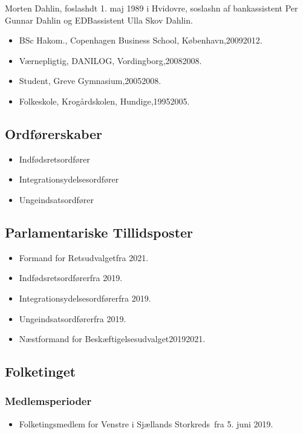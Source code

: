 \documentclass[11pt, a4paper]{awesome-cv}
\begin{document}
\makecvheader[R]
\makelettertitle
\begin{cvletter}
Morten Dahlin, foslashdt 1. maj 1989 i Hvidovre, soslashn af bankassistent Per Gunnar Dahlin og EDBassistent Ulla Skov Dahlin.

\begin{itemize}
\item BSc Hakom., Copenhagen Business School, København,20092012.
\item Værnepligtig, DANILOG, Vordingborg,20082008.
\item Student, Greve Gymnasium,20052008.
\item Folkeskole, Krogårdskolen, Hundige,19952005.
\end{itemize}
\subsection*{Ordførerskaber}
\begin{itemize}
\item Indfødsretsordfører
\item Integrationsydelsesordfører
\item Ungeindsatsordfører
\end{itemize}
\subsection*{Parlamentariske Tillidsposter}
\begin{itemize}
\item Formand for Retsudvalgetfra 2021.
\item Indfødsretsordførerfra 2019.
\item Integrationsydelsesordførerfra 2019.
\item Ungeindsatsordførerfra 2019.
\item Næstformand for Beskæftigelsesudvalget20192021.
\end{itemize}
\subsection*{Folketinget}
\subsubsection*{Medlemsperioder}
\begin{itemize}
\item Folketingsmedlem for Venstre i Sjællands Storkreds fra 5. juni 2019.
\end{itemize}

\end{cvletter}
\end{document}

